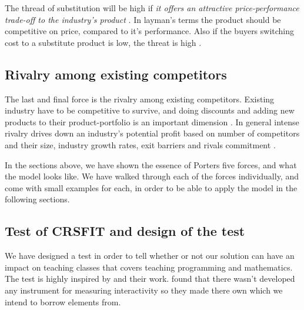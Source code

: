 
The thread of substitution will be high if \emph{it offers an attractive price-performance trade-off to the industry's product} \cite[p.~84]{porter2008five}. In layman's terms the product should be competitive on price, compared to it's performance. Also if the buyers switching cost to a substitute product is low, the threat is high \cite[p.~84]{porter2008five}.

\subsection{Rivalry among existing competitors}
The last and final force is the rivalry among existing competitors. Existing industry have to be competitive to survive, and doing discounts and adding new products to their product-portfolio is an important dimension \cite[p.~85]{porter2008five}. In general intense rivalry drives down an industry's potential profit based on number of competitors and their size, industry growth rates, exit barriers and rivals commitment \cite[p.~85]{porter2008five}. 

In the sections above, we have shown the essence of Porters five forces, and what the model looks like. We have walked through each of the forces individually, and come with small examples for each, in order to be able to apply the model in the following sections.  


































\subsection{Test of CRSFIT and design of the test}
We have designed a test in order to tell whether or not our solution can have an impact on teaching classes that covers teaching programming and mathematics. The test is highly inspired by \cite{siau2006use} and their work.  found that there wasn't developed any instrument for measuring interactivity so they made there own which we intend to borrow elements from.

